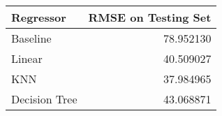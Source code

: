 \begin{tabular}{lr}
\toprule
     Regressor &  RMSE on Testing Set \\
\midrule
      Baseline &            78.952130 \\
        Linear &            40.509027 \\
           KNN &            37.984965 \\
 Decision Tree &            43.068871 \\
\bottomrule
\end{tabular}
